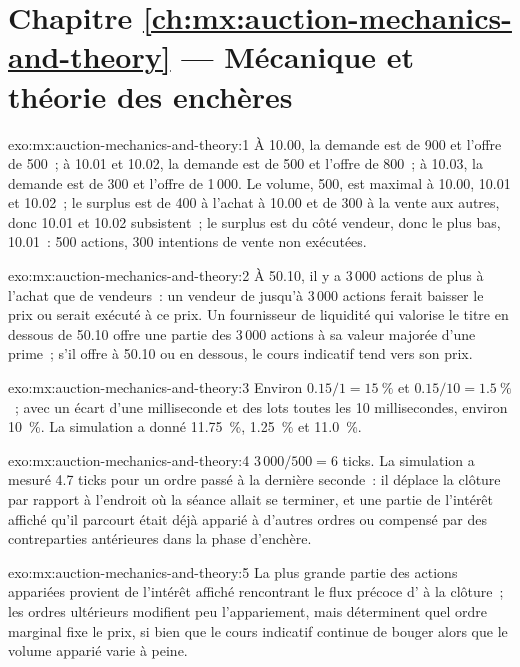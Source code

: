 \section*{Chapitre \ref{ch:mx:auction-mechanics-and-theory} --- Mécanique et théorie des enchères}

\begin{solution}{exo:mx:auction-mechanics-and-theory:1}
À 10.00, la demande est de 900 et l'offre de 500~; à 10.01 et 10.02, la demande est de 500 et l'offre de 800~; à 10.03, la demande est de 300 et l'offre de 1\,000. Le volume, 500, est maximal à
10.00, 10.01 et 10.02~; le surplus est de 400 à l'achat à 10.00 et de 300 à la vente aux autres, donc 10.01 et 10.02 subsistent~; le surplus est du côté vendeur, donc le
plus bas, 10.01~: 500 actions, 300 intentions de vente non exécutées.
\end{solution}

\begin{solution}{exo:mx:auction-mechanics-and-theory:2}
À 50.10, il y a 3\,000 actions de plus à l'achat que de vendeurs~: un vendeur de jusqu'à 3\,000 actions ferait baisser le prix ou serait exécuté à ce prix. Un fournisseur de liquidité qui valorise le titre
en dessous de 50.10 offre une partie des 3\,000 actions à sa valeur majorée d'une prime~; s'il offre à 50.10 ou en dessous, le cours indicatif tend vers son prix.
\end{solution}

\begin{solution}{exo:mx:auction-mechanics-and-theory:3}
Environ $0.15/1=15~\%$ et $0.15/10=1.5~\%$~; avec un écart d'une milliseconde et des lots toutes les 10 millisecondes, environ 10~\%. La simulation a donné 11.75~\%, 1.25~\% et 11.0~\%.
\end{solution}

\begin{solution}{exo:mx:auction-mechanics-and-theory:4}
$3\,000/500=6$ ticks. La simulation a mesuré 4.7 ticks pour un ordre passé à la dernière seconde~: il déplace la clôture par rapport à l'endroit où la séance allait se terminer, et une partie de
l'intérêt affiché qu'il parcourt était déjà apparié à d'autres ordres ou compensé par des contreparties antérieures dans la phase d'enchère.
\end{solution}

\begin{solution}{exo:mx:auction-mechanics-and-theory:5}
La plus grande partie des actions appariées provient de l'intérêt affiché rencontrant le flux précoce d' à la clôture~; les ordres ultérieurs modifient peu l'appariement, mais déterminent quel
ordre marginal fixe le prix, si bien que le cours indicatif continue de bouger alors que le volume apparié varie à peine.
\end{solution}

